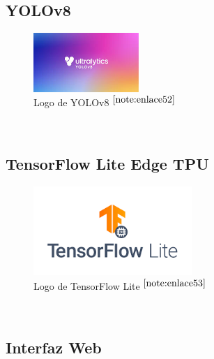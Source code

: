 \setcounter{footnote}{51} %

\subsection{YOLOv8}


\begin{figure} [h!]
	\begin{center}
		\includegraphics[width=4cm]{figs/yolov8.png}
	\end{center}
	\caption{Logo de YOLOv8 $^{\ref{note:enlace52}}$} 
	\label{fig:yolov8}
\end{figure}\

\setcounter{footnote}{52} %


\subsection{TensorFlow Lite Edge TPU}

\begin{figure} [h!]
	\begin{center}
		\includegraphics[width=6cm]{figs/tflite.png}
	\end{center}
	\caption{Logo de TensorFlow Lite $^{\ref{note:enlace53}}$} 
	\label{fig:tflite}
\end{figure}\

\setcounter{footnote}{53} %


\subsection{Interfaz Web}

